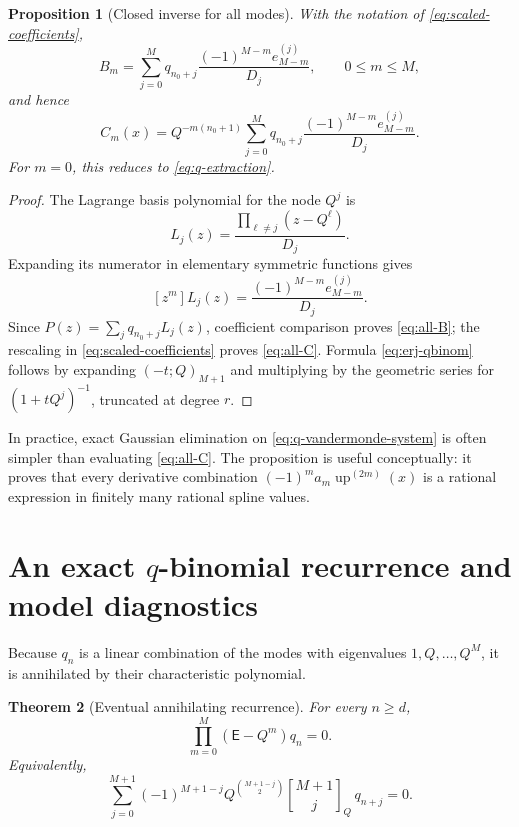 \documentclass[11pt]{article}
\newtheorem{theorem}{Theorem}[section]
\newtheorem{proposition}[theorem]{Proposition}
\newcommand{\upf}{\operatorname{up}}
\newcommand{\qbinom}[3]{\genfrac{[}{]}{0pt}{}{#1}{#2}_{#3}}
\newcommand{\Shift}{\mathsf{E}}
\begin{document}
\begin{proposition}[Closed inverse for all modes]\label{prop:all-coefficients}
With the notation of \cref{eq:scaled-coefficients},
\begin{equation}\label{eq:all-B}
 B_m=\sum_{j=0}^{M}q_{n_0+j}
 \frac{(-1)^{M-m}e_{M-m}^{(j)}}{D_j},
 \qquad 0\le m\le M,
\end{equation}
and hence
\begin{equation}\label{eq:all-C}
 C_m(x)=Q^{-m(n_0+1)}
 \sum_{j=0}^{M}q_{n_0+j}
 \frac{(-1)^{M-m}e_{M-m}^{(j)}}{D_j}.
\end{equation}
For \(m=0\), this reduces to \cref{eq:q-extraction}.
\end{proposition}

\begin{proof}
The Lagrange basis polynomial for the node \(Q^j\) is
\[
 L_j(z)=\frac{\prod_{\ell\ne j}(z-Q^\ell)}{D_j}.
\]
Expanding its numerator in elementary symmetric functions gives
\[
 [z^m]L_j(z)=\frac{(-1)^{M-m}e_{M-m}^{(j)}}{D_j}.
\]
Since \(P(z)=\sum_jq_{n_0+j}L_j(z)\), coefficient comparison proves
\cref{eq:all-B}; the rescaling in \cref{eq:scaled-coefficients} proves
\cref{eq:all-C}.  Formula \cref{eq:erj-qbinom} follows by expanding
\((-t;Q)_{M+1}\) and multiplying by the geometric series for
\((1+tQ^j)^{-1}\), truncated at degree \(r\).
\end{proof}

In practice, exact Gaussian elimination on \cref{eq:q-vandermonde-system} is
often simpler than evaluating \cref{eq:all-C}.  The proposition is useful
conceptually: it proves that every derivative combination
\((-1)^ma_m\upf^{(2m)}(x)\) is a rational expression in finitely many rational
spline values.

\section{An exact \(q\)-binomial recurrence and model diagnostics}

Because \(q_n\) is a linear combination of the modes with eigenvalues
\(1,Q,\ldots,Q^M\), it is annihilated by their characteristic polynomial.

\begin{theorem}[Eventual annihilating recurrence]\label{thm:recurrence}
For every \(n\ge d\),
\begin{equation}\label{eq:recurrence-operator}
 \prod_{m=0}^{M}(\Shift-Q^m)q_n=0.
\end{equation}
Equivalently,
\begin{equation}\label{eq:recurrence-qbinom}
 \boxed{\displaystyle
 \sum_{j=0}^{M+1}(-1)^{M+1-j}
 Q^{\binom{M+1-j}{2}}
 \qbinom{M+1}{j}{Q}\,q_{n+j}=0.}
\end{equation}
\end{theorem}
\end{document}
